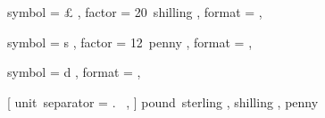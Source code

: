 

 {
	symbol = { £ } ,
	factor = { 20~shilling } ,
	format = { \SYMBOL\VALUE } ,
}

 {
	symbol = { s } ,
	factor = { 12~penny } ,
	format = { \VALUE\SYMBOL } ,
}

 {
	symbol = { d } ,
	format = { \VALUE\SYMBOL } ,
}

 [
	unit~separator = {.~} ,
] {
	pound~sterling ,
	shilling ,
	penny
}
